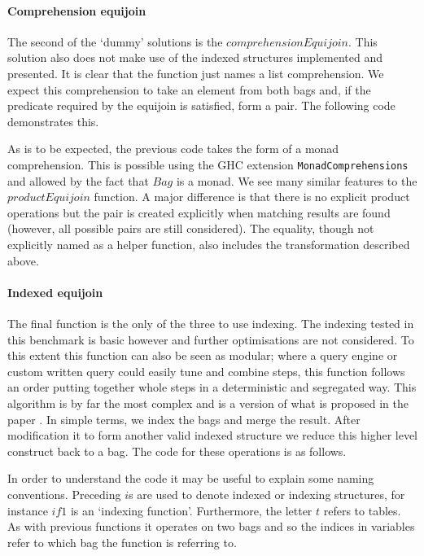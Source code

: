 \paragraph{Comprehension equijoin} The second of the `dummy' solutions is the
$comprehensionEquijoin$.
This solution also does not make use of the indexed structures implemented and
presented. It is
clear that the function just names a list comprehension. We expect this
comprehension to take an element from both bags and, if the predicate required
by the equijoin is satisfied, form a pair. The following code demonstrates
this.



\noindent
As is to be expected, the previous code takes the form of a monad comprehension.
This is possible using the GHC extension \verb|MonadComprehensions| and allowed by
the fact that $Bag$ is a monad. We see many similar
features to the $productEquijoin$ function. A major difference is that there is
no explicit product operations but the pair is created explicitly when matching
results are found (however, all possible pairs are still considered). The equality, though
not explicitly named as a helper function, also includes the transformation described above.

\paragraph{Indexed equijoin} The final function is the only of the three to use
indexing. The indexing tested in this benchmark is basic however and further
optimisations are not considered. To this extent this function can also be seen as
modular; where a query engine or
custom written query could easily tune and combine steps, this function follows an
order putting together whole steps in a deterministic and segregated way.
This algorithm is by far
the most complex and is a version of what is proposed in the paper \relalg{}. In
simple terms, we index the bags and merge the result. After modification it to form
another valid indexed
structure we reduce this higher level construct back to a bag. The code for
these operations is as follows.



\noindent
In order to understand the code it may be useful to explain some naming
conventions. Preceding $i$s are used to denote indexed or indexing structures,
for instance $if1$ is an `indexing function'. Furthermore, the letter $t$
refers to tables. As with previous functions it operates on two bags and
so the indices in variables refer to which bag the function is referring to.

